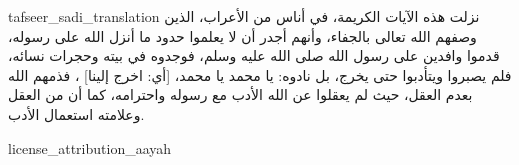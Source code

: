 \begin{taggedblock}{tafseer_sadi_translation}
نزلت هذه الآيات الكريمة، في أناس من الأعراب، الذين وصفهم الله تعالى بالجفاء، وأنهم أجدر أن لا يعلموا حدود ما أنزل الله على رسوله، قدموا وافدين على رسول الله صلى الله عليه وسلم، فوجدوه في بيته وحجرات نسائه، فلم يصبروا ويتأدبوا حتى يخرج، بل نادوه: يا محمد يا محمد،
[أي: اخرج إلينا]
، فذمهم الله بعدم العقل، حيث لم يعقلوا عن الله الأدب مع رسوله واحترامه، كما أن من العقل وعلامته استعمال الأدب.
\end{taggedblock}
\begin{taggedblock}{license_attribution_aayah}

\end{taggedblock}
\begin{comment}
Please use the following for footnotes:- Sample\footnoteQ{Text of Qur'an footnote goes here.}.
Sample\footnoteT{Text of Tafseer footnote goes here.}.
\end{comment}